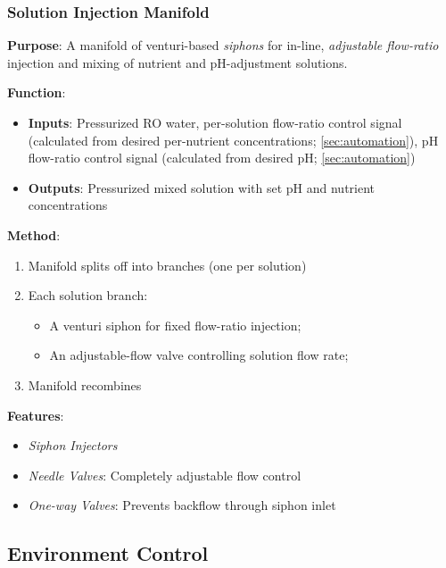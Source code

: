 \documentclass{report}
\begin{document}
\subsubsection{Solution Injection Manifold}
\label{sec:manifold}

\textbf{Purpose}: A manifold of venturi-based \textit{siphons} for in-line, \textit{adjustable flow-ratio} injection and mixing of nutrient and pH-adjustment solutions.

\textbf{Function}:
\begin{itemize}
    \item \textbf{Inputs}: Pressurized RO water, per-solution flow-ratio control signal (calculated from desired per-nutrient concentrations; \ref{sec:automation}), pH flow-ratio control signal (calculated from desired pH; \ref{sec:automation})
    \item \textbf{Outputs}: Pressurized mixed solution with set pH and nutrient concentrations
\end{itemize}

\textbf{Method}:
\begin{enumerate}
    \item Manifold splits off into branches (one per solution)
    \item Each solution branch:
    \begin{itemize}
        \item A venturi siphon for fixed flow-ratio injection;
        \item An adjustable-flow valve controlling solution flow rate;
    \end{itemize}
    \item Manifold recombines
\end{enumerate}

\textbf{Features}:
\begin{itemize}
    \item \textit{Siphon Injectors}
    \item \textit{Needle Valves}: Completely adjustable flow control
    \item \textit{One-way Valves}: Prevents backflow through siphon inlet
\end{itemize}


\newpage

\subsection{Environment Control}
\label{sec:environment}
\end{document}
